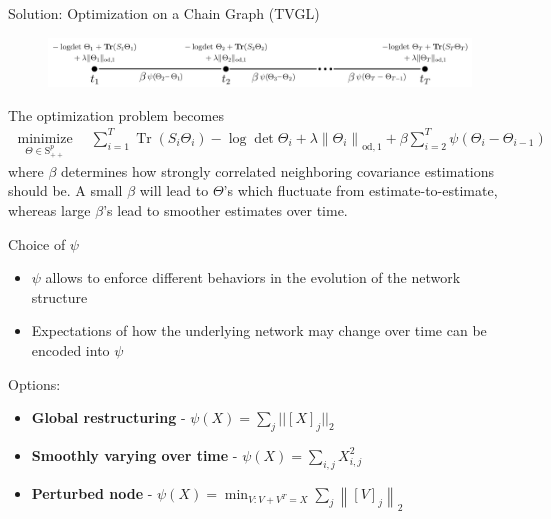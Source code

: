 \documentclass{beamer}
\begin{document}
\begin{frame}{Solution: Optimization on a Chain Graph (TVGL)}
    \begin{figure}
       \includegraphics[width=12cm]{chain_graph.png}
       \caption{\cite{hallac2017network}}
       \label{fig:chain_graph}
  \end{figure}
    The optimization problem becomes
    \begin{align*}
        \underset{\Theta \in \mathrm{S}_{++}^{p}}{\operatorname{minimize}} \quad \sum_{i=1}^{T} \operatorname{Tr}(S_{i} \Theta_{i}) -\log \operatorname{det} \Theta_{i} + \lambda\left\|\Theta_{i}\right\|_{\mathrm{od}, 1}+\beta \sum_{i=2}^{T} \psi\left(\Theta_{i}-\Theta_{i-1}\right)
    \end{align*}
    where $\beta$ determines how strongly correlated neighboring covariance estimations should be.
    A small $\beta$ will lead to $\Theta$'s which fluctuate from estimate-to-estimate, whereas large $\beta$'s lead to smoother estimates over time.
\end{frame}

\begin{frame}{Choice of $\psi$}
    \begin{itemize}
        \item $\psi$ allows to enforce different behaviors in the evolution of the network structure
        \item Expectations of how the underlying network may change over time can be encoded into $\psi$
    \end{itemize}
    Options:
    \begin{itemize}
        \item \textbf{Global restructuring} - $\psi(X) = \sum_j||[X]_j||_2$
        \item \textbf{Smoothly varying over time} - $\psi(X) = \sum_{i,j}X^2_{i,j}$
        \item \textbf{Perturbed node} - $\psi(X)=\min _{V: V+V^{T}=X} \sum_{j}\left\|[V]_{j}\right\|_{2}$
    \end{itemize}
\end{frame}
\end{document}

